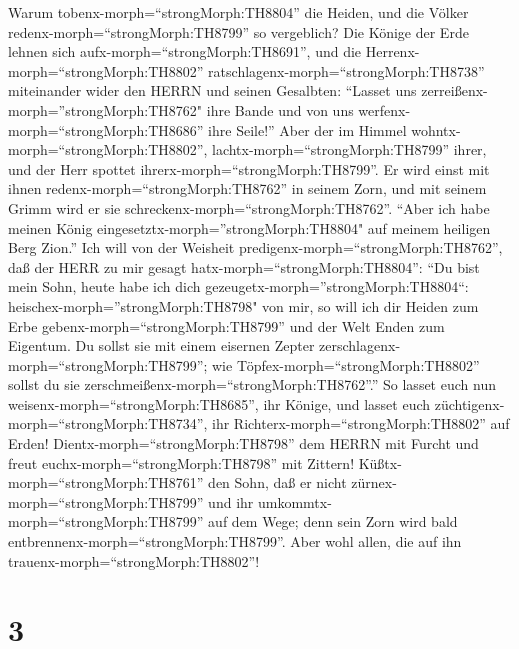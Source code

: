  Warum tobenx-morph=``strongMorph:TH8804'' die Heiden, und
die Völker redenx-morph=``strongMorph:TH8799'' so vergeblich?
 Die Könige der Erde lehnen sich
aufx-morph=``strongMorph:TH8691'', und die
Herrenx-morph=``strongMorph:TH8802''
ratschlagenx-morph=``strongMorph:TH8738'' miteinander wider den HERRN
und seinen Gesalbten:  ``Lasset uns
zerreißenx-morph=''strongMorph:TH8762" ihre Bande und von uns
werfenx-morph=``strongMorph:TH8686'' ihre Seile!''  Aber der
im Himmel wohntx-morph=``strongMorph:TH8802'',
lachtx-morph=``strongMorph:TH8799'' ihrer, und der Herr spottet
ihrerx-morph=``strongMorph:TH8799''.  Er wird einst mit
ihnen redenx-morph=``strongMorph:TH8762'' in seinem Zorn, und mit seinem
Grimm wird er sie schreckenx-morph=``strongMorph:TH8762''. 
``Aber ich habe meinen König eingesetztx-morph=''strongMorph:TH8804" auf
meinem heiligen Berg Zion.''  Ich will von der Weisheit
predigenx-morph=``strongMorph:TH8762'', daß der HERR zu mir gesagt
hatx-morph=``strongMorph:TH8804'': ``Du bist mein Sohn, heute habe ich
dich gezeugetx-morph=''strongMorph:TH8804``: 
heischex-morph=''strongMorph:TH8798" von mir, so will ich dir Heiden zum
Erbe gebenx-morph=``strongMorph:TH8799'' und der Welt Enden zum
Eigentum.  Du sollst sie mit einem eisernen Zepter
zerschlagenx-morph=``strongMorph:TH8799''; wie
Töpfex-morph=``strongMorph:TH8802'' sollst du sie
zerschmeißenx-morph=``strongMorph:TH8762''.''  So lasset
euch nun weisenx-morph=``strongMorph:TH8685'', ihr Könige, und lasset
euch züchtigenx-morph=``strongMorph:TH8734'', ihr
Richterx-morph=``strongMorph:TH8802'' auf Erden! 
Dientx-morph=``strongMorph:TH8798'' dem HERRN mit Furcht und freut
euchx-morph=``strongMorph:TH8798'' mit Zittern! 
Küßtx-morph=``strongMorph:TH8761'' den Sohn, daß er nicht
zürnex-morph=``strongMorph:TH8799'' und ihr
umkommtx-morph=``strongMorph:TH8799'' auf dem Wege; denn sein Zorn wird
bald entbrennenx-morph=``strongMorph:TH8799''. Aber wohl allen, die auf
ihn trauenx-morph=``strongMorph:TH8802''!

\hypertarget{section-2}{%
\section{3}\label{section-2}}

